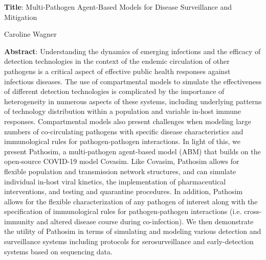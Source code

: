 \textbf{Title}: Multi-Pathogen Agent-Based Models for Disease
Surveillance and Mitigation

Caroline Wagner

\textbf{Abstract}: Understanding the dynamics of emerging infections and
the efficacy of detection technologies in the context of the endemic
circulation of other pathogens is a critical aspect of effective public
health responses against infectious diseases. The use of compartmental
models to simulate the effectiveness of different detection technologies
is complicated by the importance of heterogeneity in numerous aspects of
these systems, including underlying patterns of technology distribution
within a population and variable in-host immune responses. Compartmental
models also present challenges when modeling large numbers of
co-circulating pathogens with specific disease characteristics and
immunological rules for pathogen-pathogen interactions. In light of
this, we present Pathosim, a multi-pathogen agent-based model (ABM) that
builds on the open-source COVID-19 model Covasim. Like Covasim, Pathosim
allows for flexible population and transmission network structures, and
can simulate individual in-host viral kinetics, the implementation of
pharmaceutical interventions, and testing and quarantine procedures. In
addition, Pathosim allows for the flexible characterization of any
pathogen of interest along with the specification of immunological rules
for pathogen-pathogen interactions (i.e. cross-immunity and altered
disease course during co-infection). We then demonstrate the utility of
Pathosim in terms of simulating and modeling various detection and
surveillance systems including protocols for serosurveillance and
early-detection systems based on sequencing data.
